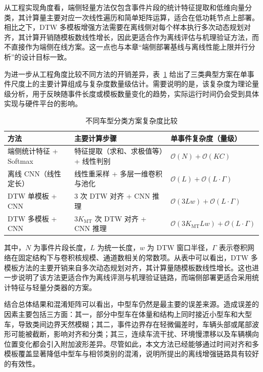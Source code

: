 \documentclass{xdupgthesis}
\begin{document}
从工程实现角度看，端侧轻量方法仅包含事件片段的统计特征提取和低维向量分类，其计算量主要对应一次线性遍历和简单矩阵运算，适合在低功耗节点上部署。相比之下，DTW 多模板增强方法需要在离线侧对每个样本执行多次动态规划对齐，其计算开销随模板数线性增长，因此更适合作为离线评估与机理验证方法，而不直接作为端侧在线方案。这一点也与本章“端侧部署基线与离线性能上限并行分析”的设计目标一致。

为进一步从工程角度比较不同方法的开销差异，表~\ref{tab:ch3_complexity} 给出了三类典型方案在单事件尺度上的主要计算组成与复杂度数量级估计。需要说明的是，该复杂度为理论量级分析，用于反映随事件长度或模板数量变化的趋势，实际运行时间仍会受到具体实现与硬件平台的影响。

\begin{table}[!htbp]
\centering
\small
\caption{不同车型分类方案复杂度比较}
\label{tab:ch3_complexity}
\setlength{\tabcolsep}{5pt}
\renewcommand{\arraystretch}{1.15}
\begin{tabular}{p{3.1cm} p{6.2cm} p{3.5cm}}
\hline
方法 & 主要计算步骤 & 单事件复杂度（量级） \\
\hline
端侧统计特征 + Softmax & 特征提取（求和、求极值等）+ 线性判别 & $\mathcal{O}(N)+\mathcal{O}(KC)$ \\
离线 CNN（线性定长） & 线性重采样 + 多层一维卷积与池化 & $\mathcal{O}(L)+\mathcal{O}(L\cdot\Gamma)$ \\
DTW 单模板 + CNN & 3 次 DTW 对齐 + CNN 推理 & $\mathcal{O}(3Lw)+\mathcal{O}(L\cdot\Gamma)$ \\
DTW 多模板 + CNN & $3K_{\mathrm{MT}}$ 次 DTW 对齐 + CNN 推理 & $\mathcal{O}(3K_{\mathrm{MT}}Lw)+\mathcal{O}(L\cdot\Gamma)$ \\
\hline
\end{tabular}
\end{table}

其中，$N$ 为事件片段长度，$L$ 为统一长度，$w$ 为 DTW 窗口半径，$\Gamma$ 表示卷积网络在固定结构下与卷积核规模、通道数相关的常数项。从表中可以看出，DTW 多模板方法的主要开销来自多次动态规划对齐，其计算量随模板数线性增长。这也进一步说明了该方法更适合作为离线评测与机理验证链路，而端侧部署更适合采用统计特征与轻量分类器的方案。

结合总体结果和混淆矩阵可以看出，中型车仍然是最主要的误差来源。造成误差的因素主要包括三方面：其一，部分中型车在体量和结构上同时接近小型车和大型车，导致类间边界天然模糊；其二，事件边界存在轻微偏差时，车辆头部或尾部波形可能被截断，影响对齐和分类；其三，连续车流干扰、环境慢漂移以及车辆横向位置变化都会引入附加波形差异。尽管如此，本文方法已经能够通过时间对齐和多模板覆盖显著降低中型车与相邻类别的混淆，说明所提出的离线增强链路具有较好的有效性。
\end{document}
